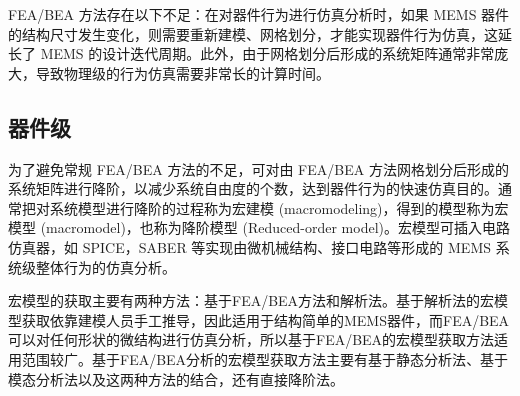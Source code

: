 \documentclass[no-math]{YangThesis}
\begin{document}
FEA/BEA 方法存在以下不足：在对器件行为进行仿真分析时，如果 MEMS 器件的结构尺寸发生变化，则需要重新建模、网格划分，才能实现器件行为仿真，这延长了 MEMS 的设计迭代周期。此外，由于网格划分后形成的系统矩阵通常非常庞大，导致物理级的行为仿真需要非常长的计算时间。

\subsection{器件级}
为了避免常规 FEA/BEA 方法的不足，可对由 FEA/BEA 方法网格划分后形成的系统矩阵进行降阶，以减少系统自由度的个数，达到器件行为的快速仿真目的。通常把对系统模型进行降阶的过程称为宏建模\cite{bibc38} (macromodeling)，得到的模型称为宏模型 (macromodel)，也称为降阶模型 (Reduced-order model)。宏模型可插入电路仿真器，如 SPICE，SABER 等实现由微机械结构、接口电路等形成的 MEMS 系统级整体行为的仿真分析。

宏模型的获取主要有两种方法\cite{bibc39}：基于FEA/BEA方法和解析法。基于解析法的宏模型获取依靠建模人员手工推导，因此适用于结构简单的MEMS器件，而FEA/BEA可以对任何形状的微结构进行仿真分析，所以基于FEA/BEA的宏模型获取方法适用范围较广。基于FEA/BEA分析的宏模型获取方法主要有基于静态分析法\cite{bibc40}、基于模态分析法\cite{bibc41}以及这两种方法的结合，还有直接降阶法\cite{bibc42}。
\end{document}
